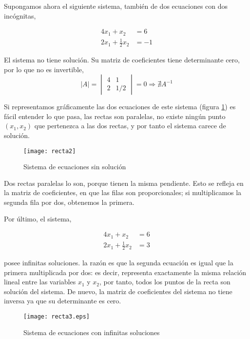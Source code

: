 Supongamos ahora el siguiente sistema, también de dos ecuaciones con dos incógnitas,

\begin{align*}
4x_1+x_2&=6\\
2x_1+\frac{1}{2} x_2&=-1
\end{align*}

El sistema no tiene solución. Su matriz de coeficientes tiene determinante cero, por lo que no es invertible,
\begin{equation*}
\vert A \vert =\begin{vmatrix}
4& 1\\
2& 1/2
\end{vmatrix} =0 \Rightarrow \nexists A^{-1}
\end{equation*}

Si representamos gráficamente las dos ecuaciones de este sistema (figura \ref{fig:recta2}) es fácil entender lo que pasa, las rectas son paralelas, no existe ningún punto $(x_1,x_2)$ que pertenezca a las dos rectas, y por tanto el sistema carece de solución.

\begin{figure}[h]
\centering
\texttt{[image: recta2]}
\caption{Sistema de ecuaciones sin solución}
\label{fig:recta2}
\end{figure}

Dos rectas paralelas lo son, porque tienen la misma pendiente. Esto se refleja en la matriz de coeficientes, en que las filas son proporcionales; si multiplicamos la segunda fila por dos, obtenemos la primera. 

Por último, el sistema,

\begin{align*}
4x_1+x_2&=6\\
2x_1+\frac{1}{2} x_2&=3
\end{align*}

posee infinitas soluciones. la razón es que la segunda ecuación es igual que la primera multiplicada por dos: es decir, representa exactamente la misma relación lineal entre las variables $x_1$ y $x_2$, por tanto, todos los puntos de la recta son solución del sistema. De nuevo, la matriz de coeficientes del sistema no tiene inversa ya que su determinante es cero.

\begin{figure}[h]
\centering
\texttt{[image: recta3.eps]}
\caption{Sistema de ecuaciones con infinitas soluciones}
\label{recta3}
\end{figure}


